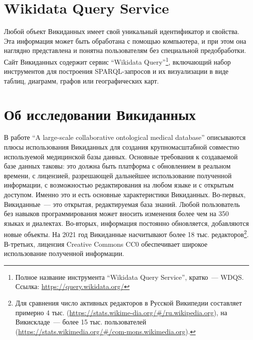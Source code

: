\section{Wikidata Query Service}
\label{sect:WDQS}

Любой объект Викиданных имеет свой уникальный идентификатор и свойства. Эта информация может быть обработана с помощью компьютера, и при этом она наглядно представлена и понятна пользователям без специальной предобработки. Сайт Викиданных содержит сервис ``Wikidata Query''\footnote{Полное название инструмента ``Wikidata Query Service'', кратко~--- WDQS. Ссылка: \href{https://query.wikidata.org/}{https://query.wikidata.org/}}, включающий набор инструментов для построения SPARQL-запросов и их визуализации в виде таблиц, диаграмм, графов или географических карт.

\section{Об исследовании Викиданных}

В работе ``A large-scale collaborative ontological medical database''\autocite{Collaborative_ontological_database} 
описываются плюсы использования Викиданных для создания крупномасштабной 
совместно используемой медицинской базы данных. 
Основные требования к создаваемой базе данных таковы: 
это должна быть платформа с обновлением в реальном времени, 
с лицензией, разрешающей дальнейшее использование полученной информации, 
с возможностью редактирования на любом языке и с открытым доступом. 
Именно это и есть основные характеристики Викиданных. 
Во-первых, Викиданные~--- это открытая, редактируемая база знаний. 
Любой пользователь без навыков программирования может вносить изменения 
более чем на 350 языках и диалектах. 
Во-вторых, информация постоянно обновляется, добавляются новые объекты. 
На 2021 год Викиданные насчитывают более 18 тыс. редакторов\footnote{Для сравнения число активных редакторов в Русской Википедии 
составляет примерно 4 тыс.  
(\href{https://stats.wikimedia.org/\#/ru.wikipedia.org}{https://stats.wikime-dia.org/\#/ru.wikipedia.org}), 
на Викискладе~--- более 15 тыс. пользователей 
(\href{https://stats.wikimedia.org/\#/commons.wikimedia.org}{https://stats.wikimedia.org/\#/com-mons.wikimedia.org}).}.
В-третьих, лицензия Creative Commons CC0 обеспечивает широкое использование полученной информации. 

